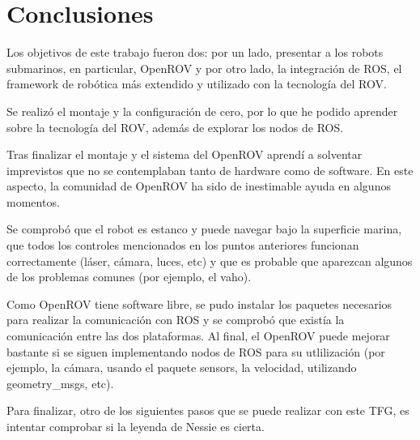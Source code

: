 \chapter{Conclusiones}
\label{cap:conclusiones}

Los objetivos de este trabajo fueron dos: por un lado, presentar a los robots submarinos, en particular, OpenROV y por otro lado, la integración de ROS, el framework de robótica más extendido y utilizado con la tecnología del ROV.

Se realizó el montaje y la configuración de cero, por lo que he podido aprender sobre la tecnología del ROV, además de explorar los nodos de ROS.

Tras finalizar el montaje y el sistema del OpenROV aprendí a solventar imprevistos que no se contemplaban tanto de hardware como de software. En este aspecto, la comunidad de OpenROV ha sido de inestimable ayuda en algunos momentos.

Se comprobó que el robot es estanco y puede navegar bajo la superficie marina, que todos los controles mencionados en los puntos anteriores funcionan correctamente (láser, cámara, luces, etc) y que es probable que aparezcan algunos de los problemas comunes (por ejemplo, el vaho).

Como OpenROV tiene software libre, se pudo instalar los paquetes necesarios para realizar la comunicación con ROS y se comprobó que existía la comunicación entre las dos plataformas. Al final, el OpenROV puede mejorar bastante si se siguen implementando nodos de ROS para su utlilización (por ejemplo, la cámara, usando el paquete sensors, la velocidad, utilizando geometry\_msgs, etc). 

Para finalizar, otro de los siguientes pasos que se puede realizar con este TFG, es intentar comprobar si la leyenda de Nessie es cierta.
